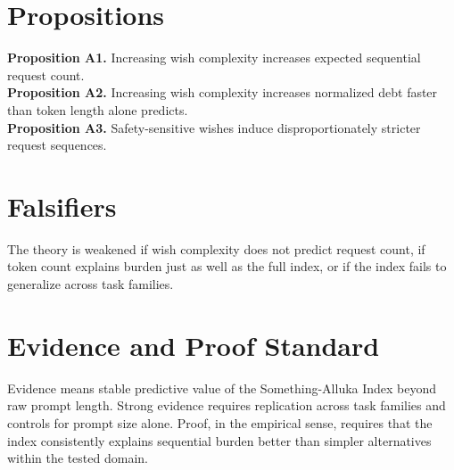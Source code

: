 \documentclass[11pt]{article}
\begin{document}
\section{Propositions}
\textbf{Proposition A1.} Increasing wish complexity increases expected sequential request count.\\
\textbf{Proposition A2.} Increasing wish complexity increases normalized debt faster than token length alone predicts.\\
\textbf{Proposition A3.} Safety-sensitive wishes induce disproportionately stricter request sequences.

\section{Falsifiers}
The theory is weakened if wish complexity does not predict request count, if token count explains burden just as well as the full index, or if the index fails to generalize across task families.

\section{Evidence and Proof Standard}
Evidence means stable predictive value of the Something-Alluka Index beyond raw prompt length. Strong evidence requires replication across task families and controls for prompt size alone. Proof, in the empirical sense, requires that the index consistently explains sequential burden better than simpler alternatives within the tested domain.

\nocite{*}


\end{document}
